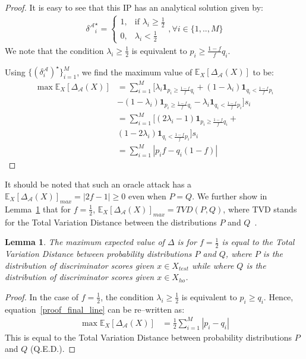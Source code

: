 \documentclass{article}
\newtheorem{lemma}{Lemma}
\begin{document}
\begin{proof}
It is easy to see that this IP has an analytical solution given by: 
\begin{align}
    {\delta^\mathcal{A}}_i^{\star} = 
    \begin{cases}
    1 ,& \text{if } \lambda_i \geq \frac{1}{2}\\
    0,              & \lambda_i < \frac{1}{2}
    \end{cases}, \forall i \in \{1,..,M\}
\end{align}
We note that the condition $\lambda_i \geq \frac{1}{2}$ is equivalent to $p_i\geq \frac{1-f}{f} q_i$. 

Using $\{(\delta^\mathcal{A}_i)^{\star}\}_{i=1}^M$, we find the maximum value of $\mathbb{E}_X[\Delta_\mathcal{A}(X)]$ to be: 
\begin{equation}
\begin{aligned}
    \max\mathbb{E}_X[\Delta_\mathcal{A}(X)]&= \sum_{i=1}^M [\lambda_i \mathbf{1}_{p_i\geq \frac{1-f}{f} q_i} + (1 - \lambda_i) \mathbf{1}_{q_i <  \frac{1-f}{f} p_i} 
    \\&-  (1 - \lambda_i) \mathbf{1}_{p_i\geq \frac{1-f}{f} q_i} - \lambda_i \mathbf{1}_{q_i <  \frac{1-f}{f} p_i}] s_i \\
    & =  \sum_{i=1}^M [(2 \lambda_i - 1)\mathbf{1}_{p_i\geq \frac{1-f}{f} q_i} + \\
    &(1 - 2 \lambda_i ) \mathbf{1}_{q_i <  \frac{1-f}{f} p_i}]s_i \\
    &=   \sum_{i=1}^M |p_i f - q_i (1-f)| \label{proof_final_line}
\end{aligned}    
\end{equation}
\end{proof}
It should be noted that such an oracle attack has a $\mathbb{E}_X[\Delta_\mathcal{A}(X)]_{max} = |2 f - 1| \geq 0$ even when $P = Q$.
We further show in Lemma~\ref{LemmaTVD} that for $f=\frac{1}{2}$, $\mathbb{E}_X[\Delta_\mathcal{A}(X)]_{max} = TVD(P,Q)$, where TVD stands for the Total Variation Distance between the distributions $P$ and $Q$~\cite{dudley2010distances}. 

\begin{lemma}
\label{LemmaTVD}
The maximum expected value of $\Delta$ is for $f=\frac{1}{2}$ is equal to the Total Variation Distance between probability distributions $P$ and $Q$, where $P$ is the distribution of discriminator scores given $x \in X_{test}$ while where $Q$ is the distribution of discriminator scores given $x \in X_{ho}$.
\end{lemma}

\begin{proof}
In the case of $f = \frac{1}{2}$, the condition $\lambda_i \geq \frac{1}{2}$ is equivalent to $p_i \geq q_i$. Hence, equation~\ref{proof_final_line} can be re--written as: 
\begin{align}
    \max\mathbb{E}_X[\Delta_\mathcal{A}(X)] &= \frac{1}{2} \sum_{i=1}^M |p_i - q_i|
\end{align}
This is equal to the Total Variation Distance between probability distributions $P$ and $Q$ (Q.E.D.). 
\end{proof}
\end{document}
